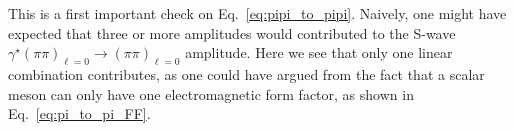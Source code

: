 This is a first important check on Eq.~\ref{eq:pipi_to_pipi}. Naively, one might have expected that three or more amplitudes would contributed to the S-wave $\gamma^\star(\pi\pi)_{\ell=0}\to(\pi\pi)_{\ell=0}$ amplitude. Here we see that only one linear combination contributes, as one could have argued from the fact that a scalar meson can only have one electromagnetic form factor, as shown in Eq.~\ref{eq:pi_to_pi_FF}. 

 

%
